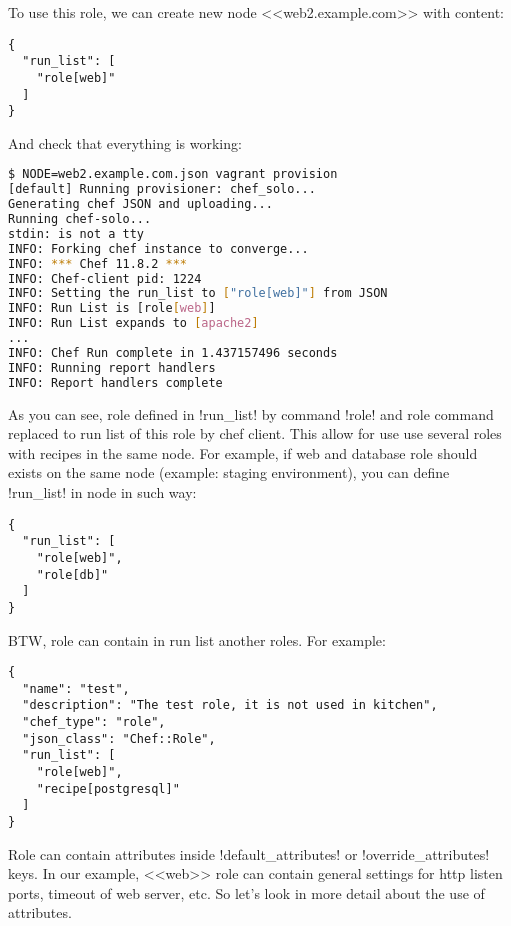 To use this role, we can create new node <<web2.example.com>> with content:

\begin{lstlisting}[label=lst:my-cloud-role2,title=my-cloud/nodes/web2.example.com.json]
{
  "run_list": [
    "role[web]"
  ]
}
\end{lstlisting}

And check that everything is working:

\begin{lstlisting}[language=Bash,label=lst:my-cloud-role3]
$ NODE=web2.example.com.json vagrant provision
[default] Running provisioner: chef_solo...
Generating chef JSON and uploading...
Running chef-solo...
stdin: is not a tty
INFO: Forking chef instance to converge...
INFO: *** Chef 11.8.2 ***
INFO: Chef-client pid: 1224
INFO: Setting the run_list to ["role[web]"] from JSON
INFO: Run List is [role[web]]
INFO: Run List expands to [apache2]
...
INFO: Chef Run complete in 1.437157496 seconds
INFO: Running report handlers
INFO: Report handlers complete
\end{lstlisting}

As you can see, role defined in \inline!run_list! by command \inline!role! and role command replaced to run list of this role by chef client. This allow for use use several roles with recipes in the same node. For example, if web and database role should exists on the same node (example: staging environment), you can define \inline!run_list! in node in such way:

\begin{lstlisting}[label=lst:my-cloud-role4,title=my-cloud/nodes/web2.example.com.json]
{
  "run_list": [
    "role[web]",
    "role[db]"
  ]
}
\end{lstlisting}

BTW, role can contain in run list another roles. For example:

\begin{lstlisting}[label=lst:my-cloud-role5,title=my-cloud/roles/test.json]
{
  "name": "test",
  "description": "The test role, it is not used in kitchen",
  "chef_type": "role",
  "json_class": "Chef::Role",
  "run_list": [
    "role[web]",
    "recipe[postgresql]"
  ]
}
\end{lstlisting}

Role can contain attributes inside \inline!default_attributes! or \inline!override_attributes! keys. In our example, <<web>> role can contain general settings for http listen ports, timeout of web server, etc. So let's look in more detail about the use of attributes.
